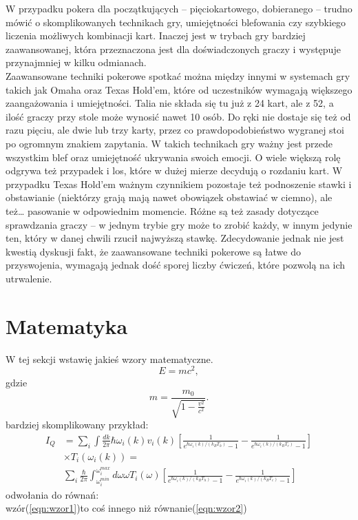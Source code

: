 \documentclass{article}
\begin{document}
W przypadku pokera dla początkujących – pięciokartowego, dobieranego – trudno mówić o skomplikowanych technikach gry, umiejętności blefowania czy szybkiego liczenia możliwych kombinacji kart. Inaczej jest w trybach gry bardziej zaawansowanej, która przeznaczona jest dla doświadczonych graczy i występuje przynajmniej w kilku odmianach.\\
Zaawansowane techniki pokerowe spotkać można między innymi w systemach gry takich jak Omaha oraz Texas Hold’em, które od uczestników wymagają większego zaangażowania i umiejętności. Talia nie składa się tu już z 24 kart, ale z 52, a ilość graczy przy stole może wynosić nawet 10 osób. Do ręki nie dostaje się też od razu pięciu, ale dwie lub trzy karty, przez co prawdopodobieństwo wygranej stoi po ogromnym znakiem zapytania. W takich technikach gry ważny jest przede wszystkim blef oraz umiejętność ukrywania swoich emocji. O wiele większą rolę odgrywa też przypadek i los, które w dużej mierze decydują o rozdaniu kart. W przypadku Texas Hold’em ważnym czynnikiem pozostaje też podnoszenie stawki i obstawianie (niektórzy grają mają nawet obowiązek obstawiać w ciemno), ale też… pasowanie w odpowiednim momencie. Różne są też zasady dotyczące sprawdzania graczy – w jednym trybie gry może to zrobić każdy, w innym jedynie ten, który w danej chwili rzucił najwyższą stawkę. Zdecydowanie jednak nie jest kwestią dyskusji fakt, że zaawansowane techniki pokerowe są łatwe do przyswojenia, wymagają jednak dość sporej liczby ćwiczeń, które pozwolą na ich utrwalenie.


\section{Matematyka}\label{sec:matematyka}
W tej sekcji wstawię jakieś wzory matematyczne.
\begin{equation}
    E = mc^2,
    \label{eqn:wzor1}
\end{equation}
gdzie
\begin{equation}
    m = \frac{m_0}{\sqrt{1-\frac{v^2}{c^2}}}.
\end{equation}
bardziej skomplikowany przykład:
\begin{equation}
\begin{split}
I_Q & = \sum_i \int \frac{dk}{2 \pi} \hbar \omega_i(k) v_i(k) \left[\frac{1}{e^{\hbar \omega_i(k) / (k_B T_h)} -1} - \frac{1}{e^{\hbar \omega_i(k) / (k_B T_c)} -1} \right] \\
& \times T_{i}(\omega_i(k)) = \\
& \sum_i \frac{\hbar}{2\pi} \int_{\omega_i^{min}}^{\omega_i^{max}} d\omega \omega T_{i}(\omega) \left[\frac{1}{e^{\hbar \omega_i(k) / (k_B T_h)} -1} - \frac{1}{e^{\hbar \omega_i(k) / (k_B T_c)} -1} \right]
\end{split}
\label{eqn:wzor2}
\end{equation} 
odwołania do równań:\\
wzór(\ref{eqn:wzor1})to coś innego niż równanie(\ref{eqn:wzor2})\\
\end{document}
